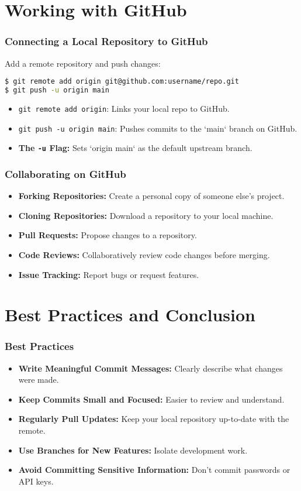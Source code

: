 \documentclass{beamer}
\begin{document}
\section{Working with GitHub}

\begin{frame}[fragile]
  \frametitle{Connecting a Local Repository to GitHub}
  Add a remote repository and push changes:
  \begin{lstlisting}[language=bash]
$ git remote add origin git@github.com:username/repo.git
$ git push -u origin main
  \end{lstlisting}
  \begin{itemize}
    \item \texttt{git remote add origin}: Links your local repo to GitHub.
    \item \texttt{git push -u origin main}: Pushes commits to the `main` branch on GitHub.
    \item \textbf{The \texttt{-u} Flag:} Sets `origin main` as the default upstream branch.
  \end{itemize}
\end{frame}

\begin{frame}
  \frametitle{Collaborating on GitHub}
  \begin{itemize}
    \item \textbf{Forking Repositories:} Create a personal copy of someone else's project.
    \item \textbf{Cloning Repositories:} Download a repository to your local machine.
    \item \textbf{Pull Requests:} Propose changes to a repository.
    \item \textbf{Code Reviews:} Collaboratively review code changes before merging.
    \item \textbf{Issue Tracking:} Report bugs or request features.
  \end{itemize}
\end{frame}

\section{Best Practices and Conclusion}

\begin{frame}
  \frametitle{Best Practices}
  \begin{itemize}
    \item \textbf{Write Meaningful Commit Messages:} Clearly describe what changes were made.
    \item \textbf{Keep Commits Small and Focused:} Easier to review and understand.
    \item \textbf{Regularly Pull Updates:} Keep your local repository up-to-date with the remote.
    \item \textbf{Use Branches for New Features:} Isolate development work.
    \item \textbf{Avoid Committing Sensitive Information:} Don't commit passwords or API keys.
  \end{itemize}
\end{frame}
\end{document}
